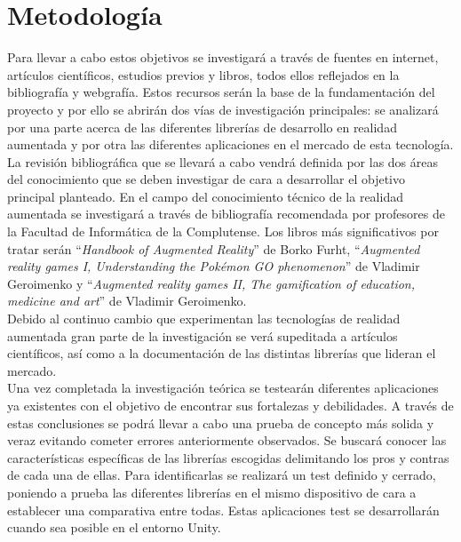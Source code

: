 \section*{Metodología}
Para llevar a cabo estos objetivos se investigará a través de fuentes en internet, artículos científicos, estudios previos y libros, todos ellos reflejados en la bibliografía y webgrafía. Estos recursos serán la base de la fundamentación del proyecto y por ello se abrirán dos vías de investigación principales: se analizará por una parte acerca de las diferentes librerías de desarrollo en realidad aumentada y por otra las diferentes aplicaciones en el mercado de esta tecnología.\\

La revisión bibliográfica que se llevará a cabo vendrá definida por las dos áreas del conocimiento que se deben investigar de cara a desarrollar el objetivo principal planteado. En el campo del conocimiento técnico de la realidad aumentada se investigará a través de bibliografía recomendada por profesores de la Facultad de Informática de la Complutense. Los libros más significativos por tratar serán “\textit{Handbook of Augmented Reality}” de Borko Furht, “\textit{Augmented reality games I, Understanding the Pokémon GO phenomenon}” de Vladimir Geroimenko y “\textit{Augmented reality games II, The gamification of education, medicine and art}” de Vladimir Geroimenko.\\

Debido al continuo cambio que experimentan las tecnologías de realidad aumentada gran parte de la investigación se verá supeditada a artículos científicos, así como a la documentación de las distintas librerías que lideran el mercado.\\

Una vez completada la investigación teórica se testearán diferentes aplicaciones ya existentes con el objetivo de encontrar sus fortalezas y debilidades. A través de estas conclusiones se podrá llevar a cabo una prueba de concepto más solida y veraz evitando cometer errores anteriormente observados.\vspace{\baselineskip}
Se buscará conocer las características específicas de las librerías escogidas delimitando los pros y contras de cada una de ellas. Para identificarlas se realizará un test definido y cerrado, poniendo a prueba las diferentes librerías en el mismo dispositivo de cara a establecer una comparativa entre todas. Estas aplicaciones test se desarrollarán cuando sea posible en el entorno Unity.\\

